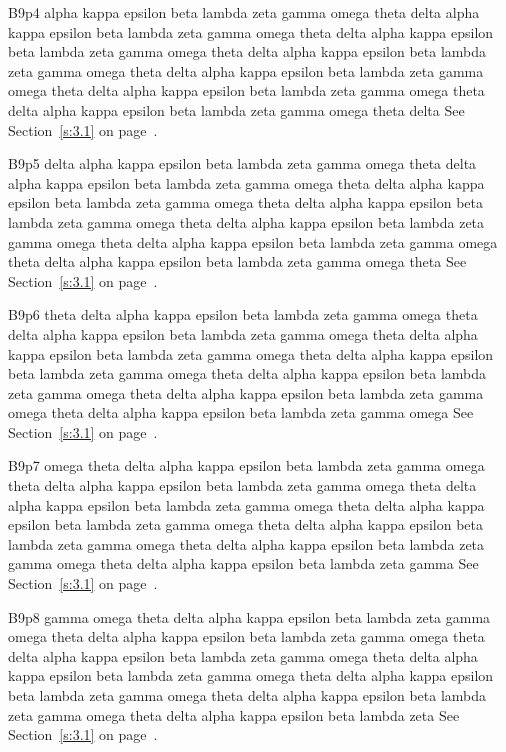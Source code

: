 B9p4 alpha kappa epsilon beta lambda zeta gamma omega theta delta alpha kappa epsilon beta lambda zeta gamma omega theta delta alpha kappa epsilon beta lambda zeta gamma omega theta delta alpha kappa epsilon beta lambda zeta gamma omega theta delta alpha kappa epsilon beta lambda zeta gamma omega theta delta alpha kappa epsilon beta lambda zeta gamma omega theta delta alpha kappa epsilon beta lambda zeta gamma omega theta delta See Section~\ref{s:3.1} on page~\pageref{s:3.1}.

B9p5 delta alpha kappa epsilon beta lambda zeta gamma omega theta delta alpha kappa epsilon beta lambda zeta gamma omega theta delta alpha kappa epsilon beta lambda zeta gamma omega theta delta alpha kappa epsilon beta lambda zeta gamma omega theta delta alpha kappa epsilon beta lambda zeta gamma omega theta delta alpha kappa epsilon beta lambda zeta gamma omega theta delta alpha kappa epsilon beta lambda zeta gamma omega theta See Section~\ref{s:3.1} on page~\pageref{s:3.1}.

B9p6 theta delta alpha kappa epsilon beta lambda zeta gamma omega theta delta alpha kappa epsilon beta lambda zeta gamma omega theta delta alpha kappa epsilon beta lambda zeta gamma omega theta delta alpha kappa epsilon beta lambda zeta gamma omega theta delta alpha kappa epsilon beta lambda zeta gamma omega theta delta alpha kappa epsilon beta lambda zeta gamma omega theta delta alpha kappa epsilon beta lambda zeta gamma omega See Section~\ref{s:3.1} on page~\pageref{s:3.1}.

B9p7 omega theta delta alpha kappa epsilon beta lambda zeta gamma omega theta delta alpha kappa epsilon beta lambda zeta gamma omega theta delta alpha kappa epsilon beta lambda zeta gamma omega theta delta alpha kappa epsilon beta lambda zeta gamma omega theta delta alpha kappa epsilon beta lambda zeta gamma omega theta delta alpha kappa epsilon beta lambda zeta gamma omega theta delta alpha kappa epsilon beta lambda zeta gamma See Section~\ref{s:3.1} on page~\pageref{s:3.1}.

B9p8 gamma omega theta delta alpha kappa epsilon beta lambda zeta gamma omega theta delta alpha kappa epsilon beta lambda zeta gamma omega theta delta alpha kappa epsilon beta lambda zeta gamma omega theta delta alpha kappa epsilon beta lambda zeta gamma omega theta delta alpha kappa epsilon beta lambda zeta gamma omega theta delta alpha kappa epsilon beta lambda zeta gamma omega theta delta alpha kappa epsilon beta lambda zeta See Section~\ref{s:3.1} on page~\pageref{s:3.1}.

